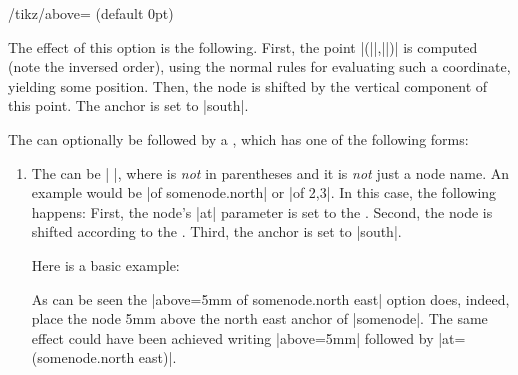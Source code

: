 \begin{key}{/tikz/above= (default 0pt)}
\begin{enumerate}
    The effect of this option is the following. First, the point
    |(||,||)|
    is computed (note the inversed order), using the normal rules for
    evaluating such a coordinate, yielding some position. Then, the
    node is shifted by the vertical component of this point. The
    anchor is set to |south|.
\begin{codeexample}[]
\end{codeexample}
  \end{enumerate}
  The  can optionally be followed by a
  , which has one of the following forms:
  \begin{enumerate}
  \item The  can be | |,
    where  is \emph{not} in parentheses and it is
    \emph{not} just a node name. An example would be
    |of somenode.north| or |of 2,3|. In this case, the
    following happens: First, the node's |at| parameter is set to the
    . Second, the node is shifted according to the
    . Third, the anchor is set to |south|.

    Here is a basic example:
\begin{codeexample}[]
\end{codeexample}
    As can be seen the |above=5mm of somenode.north east| option does,
    indeed, place the node 5mm above the north east anchor of
    |somenode|. The same effect could have been achieved writing
    |above=5mm| followed by |at=(somenode.north east)|.


\end{enumerate}
\end{key}
